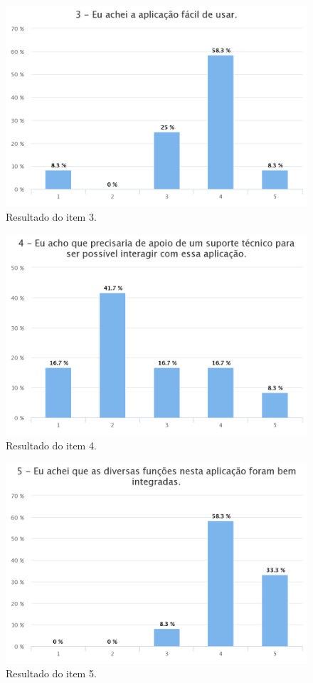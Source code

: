 \begin{figure}[!ht]
    \centering
    \includegraphics[scale=0.3]{./figuras/q3-hc.png}
    \caption{Resultado do item 3.}
    \label{fig:q3}
\end{figure}

\begin{figure}[!ht]
    \centering
    \includegraphics[scale=0.3]{./figuras/q4-hc.png}
    \caption{Resultado do item 4.}
    \label{fig:q4}
\end{figure}

\begin{figure}[!ht]
    \centering
    \includegraphics[scale=0.3]{./figuras/q5-hc.png}
    \caption{Resultado do item 5.}
    \label{fig:q5}
\end{figure}

